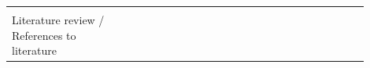 \documentclass[english, 12pt, a4paper, sci, utf8, a-1b, online]{aaltothesis}
\begin{document}
\begin{center}
\begin{longtable}{p{0.3\linewidth}p{0.6\linewidth}}
    \hline                                                                                                                                                                                                                                                                                                                                                                                                                                                                                                                                                                                                                                                                                                                                                                                                                                                                                                                                                                                            \\
    Literature review / References to literature & \textcite{what-is-api-developer-experience-and-why-it-matters} \newline \textcite{what-exactly-is-developer-experience}                                                                                                                                                                                                                                                                                                                                                                                                                                                                                                                                                                                                                                                                                                                                                                                                                            \\

\end{longtable}
\end{center}
\end{document}
